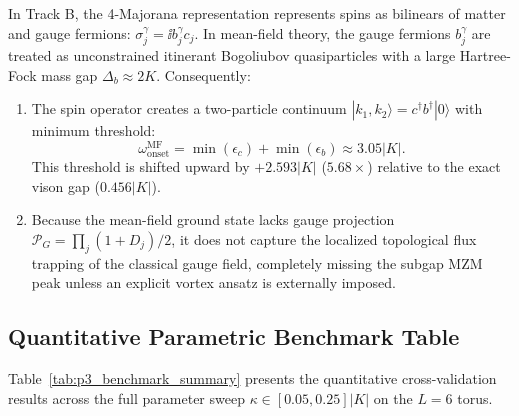 In Track B, the 4-Majorana representation represents spins as bilinears of matter and gauge fermions: $\sigma_j^\gamma = \ii b_j^\gamma c_j$. In mean-field theory, the gauge fermions $b_j^\gamma$ are treated as unconstrained itinerant Bogoliubov quasiparticles with a large Hartree-Fock mass gap $\Delta_b \approx 2 K$. Consequently:
\begin{enumerate}
    \item The spin operator creates a two-particle continuum $|k_1, k_2\rangle = c^\dagger b^\dagger |0\rangle$ with minimum threshold:
    \begin{equation}
    \omega_{\mathrm{onset}}^{\mathrm{MF}} = \min (\epsilon_c) + \min (\epsilon_b) \approx 3.05 |K|.
    \end{equation}
    This threshold is shifted upward by $+2.593 |K|$ ($5.68\times$) relative to the exact vison gap ($0.456 |K|$).
    \item Because the mean-field ground state lacks gauge projection $\mathcal{P}_G = \prod_j (1 + D_j)/2$, it does not capture the localized topological flux trapping of the classical gauge field, completely missing the subgap MZM peak unless an explicit vortex ansatz is externally imposed.
\end{enumerate}

\subsection{Quantitative Parametric Benchmark Table}
Table~\ref{tab:p3_benchmark_summary} presents the quantitative cross-validation results across the full parameter sweep $\kappa \in [0.05, 0.25] |K|$ on the $L=6$ torus.

